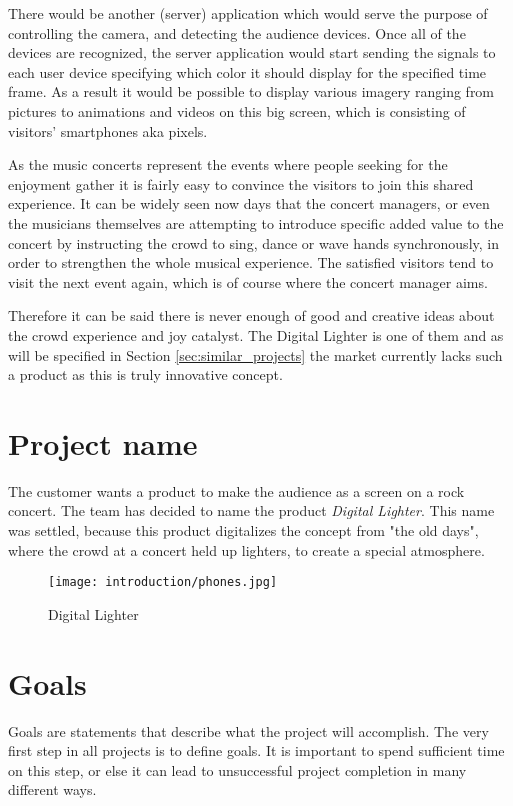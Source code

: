 There would be another (server) application which would serve the purpose of controlling the camera, and detecting the audience devices. Once all of the devices are recognized, the server application would start sending the signals to each user device specifying which color it should display for the specified time frame. As a result it would be possible to display various imagery ranging from pictures to animations and videos on this big screen, which is consisting of visitors' smartphones aka pixels.

As the music concerts represent the events where people seeking for the enjoyment gather it is fairly easy to convince the visitors to join this shared experience. It can be widely seen now days that the concert managers, or even the musicians themselves are attempting to introduce specific added value to the concert by instructing the crowd to sing, dance or wave hands synchronously, in order to strengthen the whole musical experience. The satisfied visitors tend to visit the next event again, which is of course where the concert manager aims.

Therefore it can be said there is never enough of good and creative ideas about the crowd experience and joy catalyst. The Digital Lighter is one of them and as will be specified in Section \ref{sec:similar_projects} the market currently lacks such a product as this is truly innovative concept.

\section{Project name}
The customer wants a product to make the audience as a screen on a rock concert. 
The team has decided to name the product \emph{Digital Lighter}. 
This name was settled, because this product digitalizes the concept from "the old days", where the crowd at a concert held up lighters, to create a special atmosphere. 

\begin{figure}[hbt]
\centering
\texttt{[image: introduction/phones.jpg]}
\caption{Digital Lighter}
\label{fig:digital lighter}
\end{figure}


\section{Goals}
Goals are statements that describe what the project will accomplish. 
The very first step in all projects is to define goals. 
It is important to spend sufficient time on this step, or else it can lead to unsuccessful project completion in many different ways. 
   
